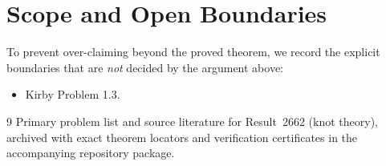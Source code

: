 \documentclass[10pt,reqno]{amsart}
\theoremstyle{definition}
\begin{document}
\section{Scope and Open Boundaries}

To prevent over-claiming beyond the proved theorem, we record the explicit boundaries that are \emph{not} decided by the argument above:
\begin{itemize}
  \item Kirby Problem 1.3.
\end{itemize}

\begin{thebibliography}{9}
Primary problem list and source literature for Result~2662 (knot theory), archived with exact theorem locators and verification certificates in the accompanying repository package.
\end{thebibliography}
\end{document}
